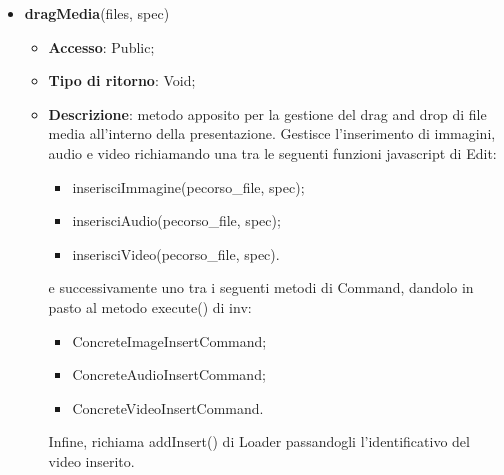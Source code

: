 {{\begin{itemize}
			\begin{itemize}
				\item \textbf{Accesso}: Public;
				\item \textbf{Tipo di ritorno}: Void;
				\item \textbf{Descrizione}: metodo che prima richiama isVideo(frames) di Upload per controllare che le estensioni siano corrette, successivamente uploadmedia(files, callback) di Upload per il caricamento dei file video nel server. Se l'operazione ha successo, viene invocato callback() il quale inserisce ogni video nel piano della presentazione, attraverso la funzione javascript inserisciVideo(percorso\_file, spec) di Edit, e richiama, utilizzando il metodo execute di inv, ConcreteVideoInsertCommand() di Command passandogli le specifiche degli elementi video inseriti. Infine, richiama addInsert() di Loader passandogli l'identificativo del video inserito. Nel caso in cui il parametro spec sia definito, significa che è stata inviata una richiesta di undo/redo da Command, per cui, il metodo si occuperà solamente di aggiornare la view.
			\end{itemize}
			\item \textbf{dragMedia}(files, spec)
			\begin{itemize}
				\item \textbf{Accesso}: Public;
				\item \textbf{Tipo di ritorno}: Void;
				\item \textbf{Descrizione}: metodo apposito per la gestione del drag and drop di file media all'interno della presentazione. Gestisce l'inserimento di immagini, audio e video richiamando una tra le seguenti funzioni javascript di Edit:
				\begin{itemize}
					\item inserisciImmagine(pecorso\_file, spec);
					\item inserisciAudio(pecorso\_file, spec);
					\item inserisciVideo(pecorso\_file, spec).
				\end{itemize}
				 e successivamente uno tra i seguenti metodi di Command, dandolo in pasto al metodo execute() di inv:
				\begin{itemize}
					\item ConcreteImageInsertCommand;
					\item ConcreteAudioInsertCommand;
					\item ConcreteVideoInsertCommand.
				\end{itemize}
				Infine, richiama addInsert() di Loader passandogli l'identificativo del video inserito.

\end{itemize}
\end{itemize}}}
